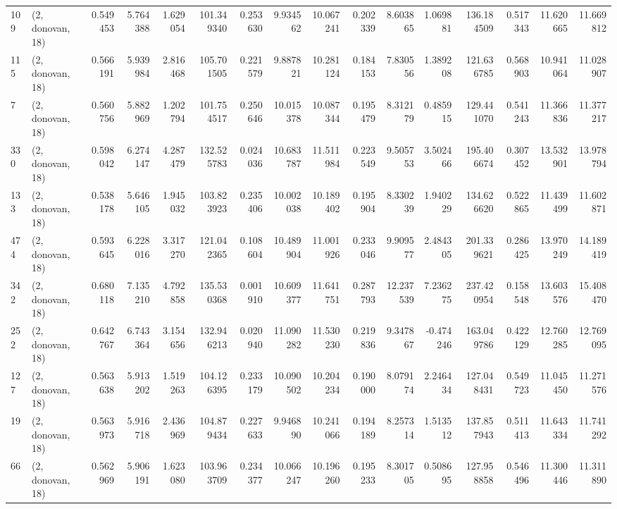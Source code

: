 \begin{tabular}{llrrrrrrrrrrrrrr}
109 &  (2, donovan, 18) &   0.549453 &   5.764388 &   1.629054 &   101.349340 &   0.253630 &   9.934562 &  10.067241 &  0.202339 &   8.603865 &   1.069881 &    136.184509 &   0.517343 &  11.620665 &   11.669812 \\
115 &  (2, donovan, 18) &   0.566191 &   5.939984 &   2.816468 &   105.701505 &   0.221579 &   9.887821 &  10.281124 &  0.184153 &   7.830556 &   1.389208 &    121.636785 &   0.568903 &  10.941064 &   11.028907 \\
7   &  (2, donovan, 18) &   0.560756 &   5.882969 &   1.202794 &   101.754517 &   0.250646 &  10.015378 &  10.087344 &  0.195479 &   8.312179 &   0.485915 &    129.441070 &   0.541243 &  11.366836 &   11.377217 \\
330 &  (2, donovan, 18) &   0.598042 &   6.274147 &   4.287479 &   132.525783 &   0.024036 &  10.683787 &  11.511984 &  0.223549 &   9.505753 &   3.502466 &    195.406674 &   0.307452 &  13.532901 &   13.978794 \\
133 &  (2, donovan, 18) &   0.538178 &   5.646105 &   1.945032 &   103.823923 &   0.235406 &  10.002038 &  10.189402 &  0.195904 &   8.330239 &   1.940229 &    134.626620 &   0.522865 &  11.439499 &   11.602871 \\
474 &  (2, donovan, 18) &   0.593645 &   6.228016 &   3.317270 &   121.042365 &   0.108604 &  10.489904 &  11.001926 &  0.233046 &   9.909577 &   2.484305 &    201.339621 &   0.286425 &  13.970249 &   14.189419 \\
342 &  (2, donovan, 18) &   0.680118 &   7.135210 &   4.792858 &   135.530368 &   0.001910 &  10.609377 &  11.641751 &  0.287793 &  12.237539 &   7.236275 &    237.420954 &   0.158548 &  13.603576 &   15.408470 \\
252 &  (2, donovan, 18) &   0.642767 &   6.743364 &   3.154656 &   132.946213 &   0.020940 &  11.090282 &  11.530230 &  0.219836 &   9.347867 &  -0.474246 &    163.049786 &   0.422129 &  12.760285 &   12.769095 \\
127 &  (2, donovan, 18) &   0.563638 &   5.913202 &   1.519263 &   104.126395 &   0.233179 &  10.090502 &  10.204234 &  0.190000 &   8.079174 &   2.246434 &    127.048431 &   0.549723 &  11.045450 &   11.271576 \\
19  &  (2, donovan, 18) &   0.563973 &   5.916718 &   2.436969 &   104.879434 &   0.227633 &   9.946890 &  10.241066 &  0.194189 &   8.257314 &   1.513512 &    137.857943 &   0.511413 &  11.643334 &   11.741292 \\
66  &  (2, donovan, 18) &   0.562969 &   5.906191 &   1.623080 &   103.963709 &   0.234377 &  10.066247 &  10.196260 &  0.195233 &   8.301705 &   0.508695 &    127.958858 &   0.546496 &  11.300446 &   11.311890 \\

\end{tabular}

